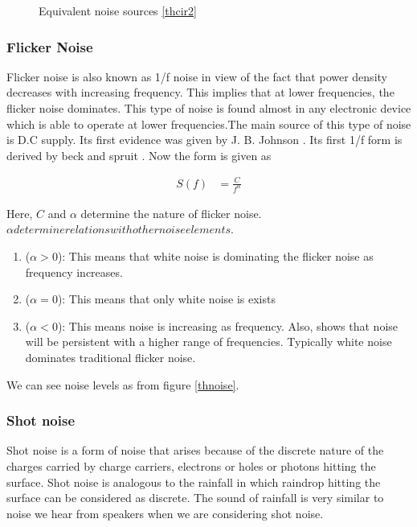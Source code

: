 \documentclass[12pt]{article}
\begin{document}
\begin{figure}[hbt!]
\caption{Equivalent noise sources \ref{thcir2} \label{thcir4}}
\end{figure}

\subsubsection{Flicker Noise \label{thflicker}}

Flicker noise is also known as 1/f noise in view of the fact that power density decreases with increasing frequency. This implies that at lower frequencies, the flicker noise dominates.
This type of noise is found  almost in any electronic device which is able to operate at lower frequencies.The main source of this type of noise is D.C supply. Its first evidence was given by J. B. Johnson \cite{j b johnson}. Its first 1/f form is derived by beck and spruit \cite{beck and spruit}. Now the form is given as 

\begin{align}
S(f) & = \frac{C}{f^{\alpha}}
\end{align}

Here, $C$ and $\alpha$ determine the nature of flicker noise. $\alpha determine relations with other noise elements$.

\begin{enumerate}
\item ($\alpha > 0$): This means that white noise is dominating the flicker noise as frequency increases.
\item ($\alpha = 0$): This means that only white noise is exists
\item ($\alpha < 0$): This means noise is increasing as frequency. Also, shows that noise will be persistent with a higher range of frequencies. Typically white noise dominates traditional flicker noise.
\end{enumerate}

We can see noise levels as from figure \ref{thnoise}.

\subsubsection{Shot noise \label{thshot}}

Shot noise is a form of noise that arises because of the discrete nature of the charges carried by charge carriers, electrons or holes or photons hitting the surface. Shot noise is analogous to the rainfall in which raindrop hitting the surface can be considered as discrete. The sound of rainfall is very similar to noise we hear from speakers when we are considering shot noise. 
\end{document}
